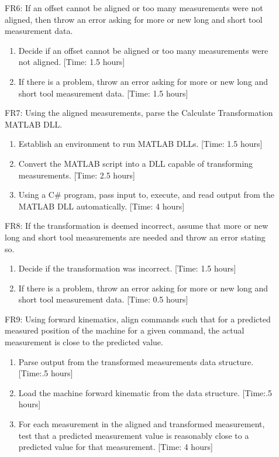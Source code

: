 \documentclass[pdftex,10pt,a4paper]{article}
\begin{document}
\begin{description}
\item[] FR6: If an offset cannot be aligned or too many measurements were not aligned, then throw an error asking for more or new long and short tool measurement data.
\begin{enumerate}
\item Decide if an offset cannot be aligned or too many measurements were not aligned. [Time: 1.5 hours]
\item If there is a problem, throw an error asking for more or new long and short tool measurement data. [Time: 1.5 hours]
\end{enumerate}

\item[] FR7: Using the aligned measurements, parse the Calculate Transformation MATLAB DLL.
\begin{enumerate}
\item Establish an environment to run MATLAB DLLs. [Time: 1.5 hours]
\item Convert the MATLAB script into a DLL capable of transforming measurements. [Time: 2.5 hours]
\item Using a C\# program, pass input to, execute, and read output from the MATLAB DLL automatically. [Time: 4 hours]
\end{enumerate}

\item[] FR8: If the transformation is deemed incorrect, assume that more or new long and short tool measurements are needed and throw an error stating so.
\begin{enumerate}
\item Decide if the transformation was incorrect. [Time: 1.5 hours]
\item If there is a problem, throw an error asking for more or new long and short tool measurement data. [Time: 0.5 hours]
\end{enumerate}

\item[] FR9: Using forward kinematics, align commands such that for a predicted measured position of the machine for a given command, the actual measurement is close to the predicted value. 
\begin{enumerate}
\item Parse output from the transformed measurements data structure. [Time:.5 hours]
\item Load the machine forward kinematic from the data structure. [Time:.5 hours]
\item For each measurement in the aligned and transformed measurement, test that a predicted measurement value is reasonably close to a predicted value for that measurement. [Time: 4 hours]
\end{enumerate}


\end{description}
\end{document}
